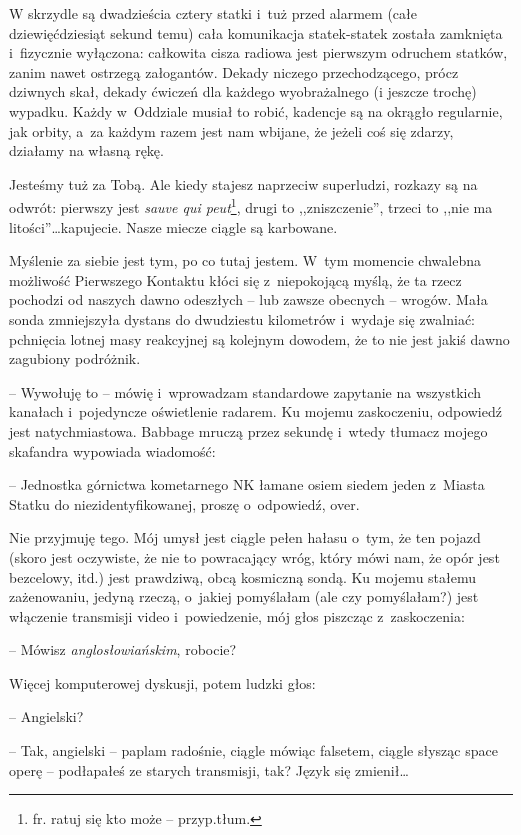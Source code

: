 \documentclass[oneside,polish,11pt,sfheadings]{mwbk}
\begin{document}
W skrzydle są dwadzieścia cztery statki i~tuż przed alarmem (całe
dziewięćdziesiąt sekund temu) cała komunikacja statek-statek została
zamknięta i~fizycznie wyłączona: całkowita cisza radiowa jest pierwszym
odruchem statków, zanim nawet ostrzegą załogantów. Dekady niczego
przechodzącego, prócz dziwnych skał, dekady ćwiczeń dla każdego
wyobrażalnego (i jeszcze trochę) wypadku. Każdy w~Oddziale musiał to
robić, kadencje są na okrągło regularnie, jak orbity, a~za każdym razem
jest nam wbijane, że jeżeli coś się zdarzy, działamy na własną rękę.

Jesteśmy tuż za Tobą. Ale kiedy stajesz naprzeciw superludzi, rozkazy są
na odwrót: pierwszy jest \textit{sauve qui peut}\footnote{ fr. ratuj się kto
może -- przyp.tłum.}, drugi to ,,zniszczenie'', trzeci to ,,nie ma
litości''\ldots  kapujecie. Nasze miecze ciągle są karbowane.

Myślenie za siebie jest tym, po co tutaj jestem. W~tym momencie
chwalebna możliwość Pierwszego Kontaktu kłóci się z~niepokojącą myślą,
że ta rzecz pochodzi od naszych dawno odeszłych -- lub zawsze obecnych -- wrogów. Mała sonda zmniejszyła dystans do dwudziestu kilometrów i~wydaje
się zwalniać: pchnięcia lotnej masy reakcyjnej są kolejnym dowodem, że
to nie jest jakiś dawno zagubiony podróżnik.

-- Wywołuję to -- mówię i~wprowadzam standardowe zapytanie na wszystkich
kanałach i~pojedyncze oświetlenie radarem. Ku mojemu zaskoczeniu,
odpowiedź jest natychmiastowa. Babbage mruczą przez sekundę i~wtedy
tłumacz mojego skafandra wypowiada wiadomość:

-- Jednostka górnictwa kometarnego NK łamane osiem siedem jeden z~Miasta
Statku do niezidentyfikowanej, proszę o~odpowiedź, over.

Nie przyjmuję tego. Mój umysł jest ciągle pełen hałasu o~tym, że ten
pojazd (skoro jest oczywiste, że nie to powracający wróg, który mówi
nam, że opór jest bezcelowy, itd.) jest prawdziwą, obcą kosmiczną sondą.
Ku mojemu stałemu zażenowaniu, jedyną rzeczą, o~jakiej pomyślałam (ale
czy pomyślałam?) jest włączenie transmisji video i~powiedzenie, mój głos
piszcząc z~zaskoczenia:

-- Mówisz \textit{anglosłowiańskim}, robocie?

Więcej komputerowej dyskusji, potem ludzki głos:

-- Angielski?

-- Tak, angielski -- paplam radośnie, ciągle mówiąc falsetem, ciągle
słysząc space operę -- podłapałeś ze starych transmisji, tak? Język się
zmienił\ldots 
\end{document}
